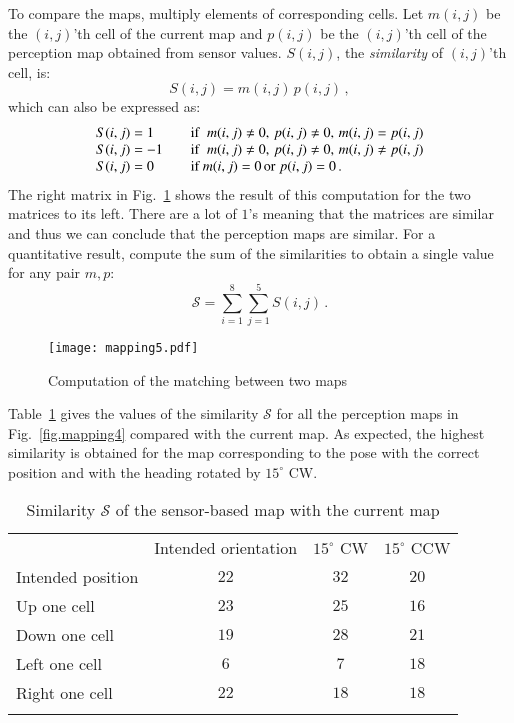 To compare the maps, multiply elements of corresponding cells. Let $m(i,j)$ be the $(i,j)$'th cell of the current map and $p(i,j)$ be the $(i,j)$'th cell of the perception map obtained from sensor values. $S(i,j)$, the \emph{similarity} of $(i,j)$'th cell, is:
\[
S(i,j) = m(i,j)\, p(i,j)\,,
\]
which can also be expressed as:
\[
\begin{array}{l@{\hspace{2em}}l}
S(i,j) = 1 & \textrm{if}\;\;m(i,j) \neq 0,\, p(i,j) \neq 0,\, m(i,j) = p(i,j)\\
S(i,j) = -1 & \textrm{if}\;\;m(i,j) \neq 0,\, p(i,j) \neq 0,\,  m(i,j) \neq p(i,j)\\
S(i,j) = 0 & \textrm{if }m(i,j) = 0\, \textrm{or}\; p(i,j) = 0\,.
\end{array}
\]
The right matrix in Fig.~\ref{fig.mapping5} shows the result of this computation for the two matrices to its left. There are a lot of $1$'s meaning that the matrices are similar and thus we can conclude that the perception maps are similar. For a quantitative result, compute the sum of the similarities to obtain a single value for any pair $m,p$:
\[
\mathcal{S} = \sum_{i=1}^8 \sum_{j=1}^5 S(i,j)\,.
\]

\begin{figure}
\begin{center}
\texttt{[image: mapping5.pdf]}
\end{center}
\caption{Computation of the matching between two maps}\label{fig.mapping5}
\end{figure}

Table~\ref{tab.matching} gives the values of the similarity $\mathcal{S}$ for all the perception maps in Fig.~\ref{fig.mapping4} compared with the current map. As expected, the highest similarity is obtained for the map corresponding to the pose with the correct position and with the heading rotated by $15^\circ$ CW.

\begin{table}
\caption{Similarity $\mathcal{S}$ of the sensor-based map with the current map}
\label{tab.matching}
\renewcommand{\arraystretch}{1.2}
\setlength{\tabcolsep}{8pt}
\begin{tabular}{p{22mm}ccc}
\svhline\noalign{\smallskip}
&Intended orientation&$15^{\circ}$ CW&$15^{\circ}$ CCW\\
Intended position & $22$ & \boldmath $32$ & $20$\\
Up one cell       & $23$ & $25$ & $16$\\
Down one cell     & $19$ & $28$ & $21$\\
Left one cell     & $6$  & $7$  & $18$\\
Right one cell    & $22$ & $18$ & $18$\\
\noalign{\smallskip}\svhline\noalign{\smallskip}
\end{tabular}
\end{table}

